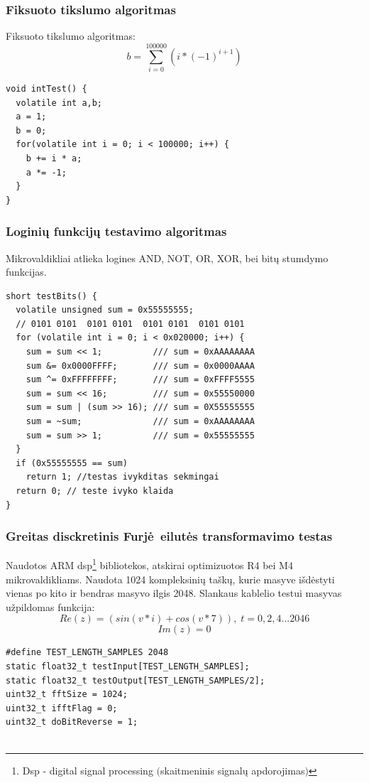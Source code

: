 \documentclass[a4paper, 12pt]{article} %
\begin{document}
\begin{onehalfspacing}
\subsubsection{Fiksuoto tikslumo algoritmas}
Fiksuoto tikslumo algoritmas:
\begin{equation}
b = \sum_{i=0}^{100000} (i * (-1)^{i+1})
\end{equation}

\begin{verbatim}
void intTest() {
  volatile int a,b;
  a = 1;
  b = 0;
  for(volatile int i = 0; i < 100000; i++) {
    b += i * a;
    a *= -1;
  }
}
\end{verbatim}
\subsubsection{Logini\k{u} funkcij\k{u} testavimo algoritmas}
Mikrovaldikliai atlieka logines AND, NOT, OR, XOR, bei bit\k{u} stumdymo funkcijas. 
\begin{verbatim}
short testBits() {
  volatile unsigned sum = 0x55555555; 
  // 0101 0101  0101 0101  0101 0101  0101 0101  
  for (volatile int i = 0; i < 0x020000; i++) {
    sum = sum << 1;          /// sum = 0xAAAAAAAA 
    sum &= 0x0000FFFF;       /// sum = 0x0000AAAA
    sum ^= 0xFFFFFFFF;       /// sum = 0xFFFF5555
    sum = sum << 16;         /// sum = 0x55550000
    sum = sum | (sum >> 16); /// sum = 0X55555555
    sum = ~sum;              /// sum = 0xAAAAAAAA
    sum = sum >> 1;          /// sum = 0x55555555
  }
  if (0x55555555 == sum)
    return 1; //testas ivykditas sekmingai
  return 0; // teste ivyko klaida
}
\end{verbatim}
\subsubsection{Greitas disckretinis Furj\.e\ eilut\.es transformavimo testas}
Naudotos ARM dsp\footnote{Dsp - digital signal processing $($skaitmeninis signal\k{u} apdorojimas$)$} bibliotekos, atskirai optimizuotos R4 bei M4 mikrovaldikliams. Naudota 1024 kompleksini\k{u} ta\v{s}k\k{u}, kurie masyve i\v{s}d\.estyti vienas po kito ir bendras masyvo ilgis 2048. Slankaus kablelio testui masyvas u\v{z}pildomas funkcija:
\begin{equation*}
Re(z) = (sin(v*i) + cos(v*7)),\; t = 0, 2, 4... 2046
\end{equation*}
\begin{equation}
Im(z) = 0
\end{equation}
\begin{verbatim}
#define TEST_LENGTH_SAMPLES 2048 
static float32_t testInput[TEST_LENGTH_SAMPLES]; 
static float32_t testOutput[TEST_LENGTH_SAMPLES/2]; 
uint32_t fftSize = 1024; 
uint32_t ifftFlag = 0; 
uint32_t doBitReverse = 1; 


\end{verbatim}
\end{onehalfspacing}
\end{document}
